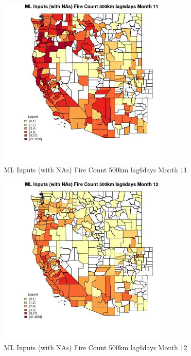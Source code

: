 \begin{figure} 
\centering  
\includegraphics[width=0.77\textwidth]{Code_Outputs/Report_ML_input_PM25_Step4_part_e_de_duplicated_aves_compiled_2019-05-21wNAs_CountyFire_Count_500km_lag6daysmedianMonth11.jpg} 
\caption{\label{fig:Report_ML_input_PM25_Step4_part_e_de_duplicated_aves_compiled_2019-05-21wNAsCountyFire_Count_500km_lag6daysmedianMonth11}ML Inputs (with NAs) Fire Count 500km lag6days Month 11} 
\end{figure} 
 

\begin{figure} 
\centering  
\includegraphics[width=0.77\textwidth]{Code_Outputs/Report_ML_input_PM25_Step4_part_e_de_duplicated_aves_compiled_2019-05-21wNAs_CountyFire_Count_500km_lag6daysmedianMonth12.jpg} 
\caption{\label{fig:Report_ML_input_PM25_Step4_part_e_de_duplicated_aves_compiled_2019-05-21wNAsCountyFire_Count_500km_lag6daysmedianMonth12}ML Inputs (with NAs) Fire Count 500km lag6days Month 12} 
\end{figure} 
 

